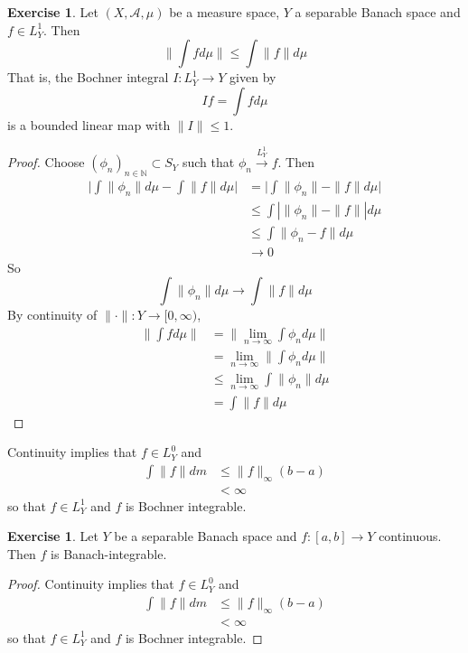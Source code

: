 \documentclass[12pt]{amsart}
\theoremstyle{definition}
\newtheorem{ex}[definition]{Exercise}
\newcommand{\N}{\mathbb{N}}
\newcommand{\MA}{\mathcal{A}}
\newcommand{\Rg}{[0,\infty)}
\newcommand{\limn}{\lim \limits_{n \rightarrow \infty}}
\newcommand{\conv}[1]{\xrightarrow{#1}}
\begin{document}
	\begin{ex}
	Let $(X, \MA, \mu)$ be a measure space, $Y$ a separable Banach space and $f \in L^1_Y$. Then $$\bigg \|\int f d\mu \bigg \| \leq \int \|f\| d\mu$$ That is, the Bochner integral $I: L^1_Y \rightarrow Y$ given by $$If = \int f d\mu$$ is a bounded linear map with $\|I\| \leq 1$.
	\end{ex}
	
	\begin{proof}
	Choose $(\phi_n)_{n \in \N} \subset S_Y$ such that $\phi_n \conv{L^1_Y} f$. Then 
	\begin{align*}
	\bigg | \int \| \phi_n \| d \mu - \int \| f\| d\mu \bigg |
	&= \bigg | \int \| \phi_n \| - \| f\| d\mu \bigg | \\
	& \leq \int |\| \phi_n \| - \| f\| | d\mu \\
	& \leq  \int \| \phi_n - f\| d\mu \\
	& \rightarrow 0
	\end{align*}
	So  $$ \int \| \phi_n \| d \mu \rightarrow  \int \| f \| d \mu$$
	By continuity of $\|\cdot\|:Y \rightarrow \Rg$,
	\begin{align*}
	\bigg \| \int f d\mu \bigg \|
	&= \bigg \| \limn \int \phi_n d\mu \bigg \| \\
	&= \limn  \bigg \| \int \phi_n d\mu \bigg \| \\
	& \leq \limn \int \| \phi_n \| d \mu \\
	&= \int \| f \| d\mu  
	\end{align*}
	\end{proof}
	
	Continuity implies that $f \in L_Y^0$ and 
	\begin{align*}
	\int \| f \| dm 
	&\leq \| f\|_{\infty}(b-a) \\
	&< \infty
\end{align*}
	so that $f \in L^1_Y$ and $f$ is Bochner integrable.
	
	\begin{ex}
	Let $Y$ be a separable Banach space and $f:[a,b] \rightarrow Y$ continuous. Then $f$ is Banach-integrable.
	\end{ex}
	
	\begin{proof}
	Continuity implies that $f \in L_Y^0$ and 
	\begin{align*}
	\int \| f \| dm 
	&\leq \| f\|_{\infty}(b-a) \\
	&< \infty
\end{align*}
	so that $f \in L^1_Y$ and $f$ is Bochner integrable.
\end{proof}			
	
\end{document}
